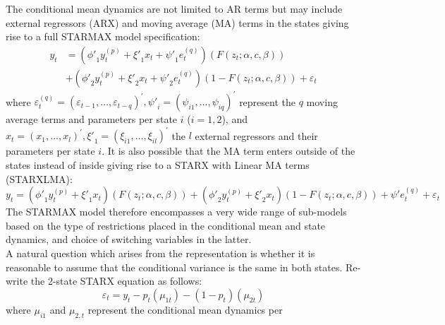 The conditional mean dynamics are not limited to AR terms but may include
external regressors (ARX) and moving average (MA) terms in the states giving
rise to a full STARMAX model specification:
\begin{equation}\label{eq:starmax}
\begin{split}
{y_t} &= \left( {{{\phi '}_1}y_t^{\left( p \right)} + {{\xi '}_1}{x_t} + {{\psi
'}_1}e_t^{\left( q \right)}} \right)\left( {F\left( {{z_t};\alpha ,c,\beta }
\right)} \right) \\
& + \left( {{{\phi '}_2}y_t^{\left( p \right)} + {{\xi
'}_2}{x_t} + {{\psi '}_2}e_t^{\left( q \right)}} \right)\left( {1 - F\left( {{z_t};\alpha ,c,\beta } \right)} \right) + {\varepsilon _t}
\end{split}
\end{equation}
where $\varepsilon _t^{\left( q \right)} = {\left( {{\varepsilon _{t -
1}},\dots,{\varepsilon _{t - q}}} \right)^\prime },{{\psi '}_i} = {\left( {{\psi
_{i1}},\dots,{\psi _{iq}}} \right)^\prime }$ represent the $q$ moving average
terms and parameters per state $i$ ($i=1,2$), and ${x_t} = {\left(
{{x_1},\dots,{x_l}} \right)^\prime },{{\xi '}_1} = {\left( {{\xi
_{i1}},\dots,{\xi _{il}}} \right)^\prime }$ the $l$ external regressors and
their parameters per state $i$. It is also possible that the MA term enters
outside of the states instead of inside giving rise to a STARX with Linear MA
terms (STARXLMA):
\begin{equation}
{y_t} = \left( {{{\phi '}_1}y_t^{\left( p \right)} + {{\xi '}_1}{x_t}}
\right)\left( {F\left( {{z_t};\alpha ,c,\beta } \right)} \right) + \left(
{{{\phi '}_2}y_t^{\left( p \right)} + {{\xi '}_2}{x_t}} \right)\left( {1 -
F\left( {{z_t};\alpha ,c,\beta } \right)} \right) + \psi 'e_t^{\left( q \right)}
+{\varepsilon _t}
\end{equation}
The STARMAX model therefore encompasses a very wide range of sub-models based on
the type of restrictions placed in the conditional mean and state dynamics, and
choice of switching variables in the latter.\\
A natural question which arises from the representation is whether it is
reasonable to assume that the conditional variance is the same in both states.
Re-write the 2-state STARX equation as follows:
\begin{equation}
{\varepsilon _t} = {y_t} - {p_t}\left( {{\mu _{1t}}} \right) - \left( {1 -
{p_t}} \right)\left( {{\mu _{2t}}} \right)
\end{equation}
where $\mu_{i1}$ and $\mu_{2,t}$ represent the conditional mean dynamics per
